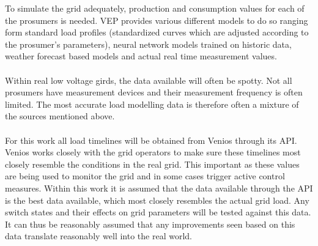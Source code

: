 To simulate the grid adequately, production and consumption values for
each of the prosumers is needed. VEP provides various different models
to do so ranging form standard load profiles (standardized curves which are adjusted
according to the prosumer's parameters), neural network models trained on historic data,
weather forecast based models and actual real time measurement values\autocite{venios}.\\
\\
Within real low voltage girds, the data available will often be spotty. Not all prosumers
have measurement devices and their measurement frequency is often limited. The most accurate
load modelling data is therefore often a mixture of the sources mentioned above.\\
\\ 
For this work all load timelines will be obtained from Venios through its API. Venios works
closely with the grid operators to make sure these timelines most closely resemble the conditions
in the real grid. This important as these values are being used to monitor the grid and in some
cases trigger active control measures\autocite{venios}. Within this work it is assumed that the data
available through the API is the best data available, which most closely resembles the actual grid load.
Any switch states and their effects on grid parameters will be tested against this data. It can
thus be reasonably assumed that any improvements seen based on this data translate reasonably well
into the real world. 

